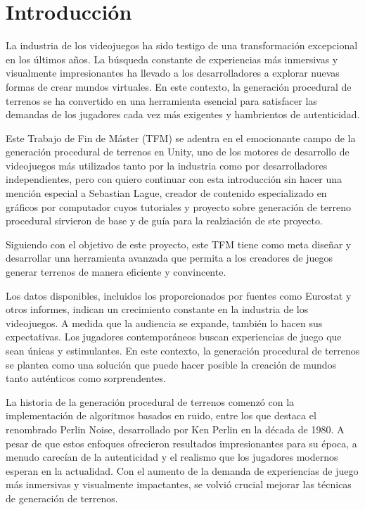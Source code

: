 
\section{Introducción}

La industria de los videojuegos ha sido testigo de una transformación excepcional en los últimos años. La búsqueda constante de experiencias más inmersivas y visualmente impresionantes ha llevado a los desarrolladores a explorar nuevas formas de crear mundos virtuales. En este contexto, la generación procedural de terrenos se ha convertido en una herramienta esencial para satisfacer las demandas de los jugadores cada vez más exigentes y hambrientos de autenticidad.

Este Trabajo de Fin de Máster (TFM) se adentra en el emocionante campo de la generación procedural de terrenos en Unity, uno de los motores de desarrollo de videojuegos más utilizados tanto por la industria como por desarrolladores independientes, pero con quiero continuar con esta introducción sin hacer una mención especial a Sebastian Lague, creador de contenido especializado en gráficos por computador cuyos tutoriales y proyecto sobre generación de terreno procedural sirvieron de base y de guía para la realziación de ste proyecto.

Siguiendo con el objetivo de este proyecto, este TFM tiene como meta diseñar y desarrollar una herramienta avanzada que permita a los creadores de juegos generar terrenos de manera eficiente y convincente.

Los datos disponibles, incluidos los proporcionados por fuentes como Eurostat y otros informes, indican un crecimiento constante en la industria de los videojuegos. A medida que la audiencia se expande, también lo hacen sus expectativas. Los jugadores contemporáneos buscan experiencias de juego que sean únicas y estimulantes. En este contexto, la generación procedural de terrenos se plantea como una solución que puede hacer posible la creación de mundos tanto auténticos como sorprendentes.

La historia de la generación procedural de terrenos comenzó con la implementación de algoritmos basados en ruido, entre los que destaca el renombrado Perlin Noise, desarrollado por Ken Perlin en la década de 1980. A pesar de que estos enfoques ofrecieron resultados impresionantes para su época, a menudo carecían de la autenticidad y el realismo que los jugadores modernos esperan en la actualidad. Con el aumento de la demanda de experiencias de juego más inmersivas y visualmente impactantes, se volvió crucial mejorar las técnicas de generación de terrenos.

